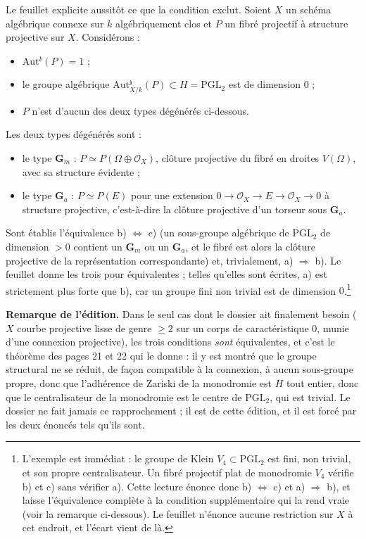 \documentclass[11pt,a4paper]{article}
\begin{document}
Le feuillet explicite aussitôt ce que la condition exclut. Soient $X$ un
schéma algébrique connexe sur $k$ algébriquement clos et $P$ un fibré
projectif à structure projective sur $X$. Considérons :

\begin{itemize}
\item[a)] $\mathrm{Aut}^{\mathfrak{z}}(P) = 1$ ;
\item[b)] le groupe algébrique
$\mathrm{Aut}^{\mathfrak{z}}_{X/k}(P) \subset H = \mathrm{PGL}_2$ est de
dimension $0$ ;
\item[c)] $P$ n'est d'aucun des deux types dégénérés ci-dessous.
\end{itemize}

Les deux types dégénérés sont :

\begin{itemize}
\item[$\alpha$)] le type $\mathbf{G}_m$ : $P \simeq P(\Omega \oplus
\mathcal{O}_X)$, clôture projective du fibré en droites $V(\Omega)$, avec sa
structure évidente ;
\item[$\beta$)] le type $\mathbf{G}_a$ : $P \simeq P(E)$ pour une extension
$0 \to \mathcal{O}_X \to E \to \mathcal{O}_X \to 0$ à structure projective,
c'est-à-dire la clôture projective d'un torseur sous $\mathbf{G}_a$.
\end{itemize}

Sont établis l'équivalence b) $\Leftrightarrow$ c) (un sous-groupe algébrique de
$\mathrm{PGL}_2$ de dimension $> 0$ contient un $\mathbf{G}_m$ ou un
$\mathbf{G}_a$, et le fibré est alors la clôture projective de la
représentation correspondante) et, trivialement, a) $\Rightarrow$ b). Le
feuillet donne les trois pour équivalentes ; telles qu'elles sont écrites,
a) est strictement plus forte que b), car un groupe fini non trivial est de
dimension $0$.\footnote{L'exemple est immédiat : le groupe de Klein
$V_4 \subset \mathrm{PGL}_2$ est fini, non trivial, et son propre
centralisateur. Un fibré projectif plat de monodromie $V_4$ vérifie b) et c)
sans vérifier a). Cette lecture énonce donc b) $\Leftrightarrow$ c) et
a) $\Rightarrow$ b), et laisse l'équivalence complète à la condition
supplémentaire qui la rend vraie (voir la remarque ci-dessous). Le feuillet
n'énonce aucune restriction sur $X$ à cet endroit, et l'écart vient de
là.}

\textbf{Remarque de l'édition.} Dans le seul cas dont le dossier ait
finalement besoin ($X$ courbe projective lisse de genre $\geqslant 2$ sur un
corps de caractéristique $0$, munie d'une connexion projective), les trois
conditions \emph{sont} équivalentes, et c'est le théorème des pages 21 et 22
qui le donne : il y est montré que le groupe structural ne se réduit, de
façon compatible à la connexion, à aucun sous-groupe propre, donc que l'adhérence de Zariski de la monodromie est $H$
tout entier, donc que le centralisateur de la monodromie est le centre de
$\mathrm{PGL}_2$, qui est trivial. Le dossier ne fait jamais ce rapprochement ;
il est de cette édition, et il est forcé par les deux énoncés tels qu'ils
sont.
\end{document}
